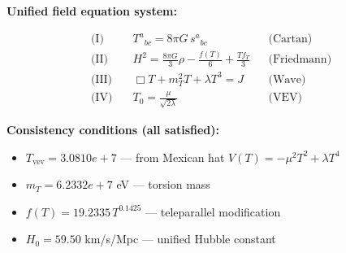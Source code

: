 
\textbf{Unified field equation system:}

\begin{align}
  \text{(I)} \quad & T^a{}_{bc} = 8\pi G \, s^a{}_{bc} && \text{(Cartan)} \\
  \text{(II)} \quad & H^2 = \frac{8\pi G}{3}\rho - \frac{f(T)}{6} + \frac{Tf_T}{3} && \text{(Friedmann)} \\
  \text{(III)} \quad & \Box T + m_T^2 T + \lambda T^3 = J && \text{(Wave)} \\
  \text{(IV)} \quad & T_0 = \frac{\mu}{\sqrt{2\lambda}} && \text{(VEV)}
\end{align}

\textbf{Consistency conditions (all satisfied):}
\begin{itemize}
  \item $T_{\text{vev}} = 3.0810e+7$ — from Mexican hat $V(T) = -\mu^2 T^2 + \lambda T^4$
  \item $m_T = 6.2332e+7$ eV — torsion mass
  \item $f(T) = 19.2335 \, T^{0.1425}$ — teleparallel modification
  \item $H_0 = 59.50$ km/s/Mpc — unified Hubble constant
\end{itemize}